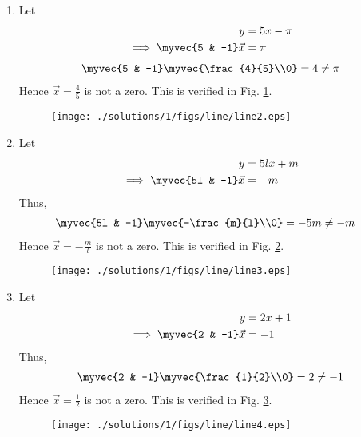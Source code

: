\begin{enumerate}[label=\arabic*.,ref=\thesubsubsection.\theenumi]
\item Let 
%
\begin{align}
y &= 5x -\pi
\\
\implies \myvec{5 & -1}\vec{x} &= \pi
\end{align}
%
%
\begin{align}
\myvec{5 & -1}\myvec{\frac{4}{5}\\0} = 4 \ne \pi
\end{align}
%
Hence $\vec{x}=\frac{4}{5}$ is not a zero. This is verified in Fig. \ref{fig:3.7.1_line2}.
%
\begin{figure}[!ht]
\texttt{[image: ./solutions/1/figs/line/line2.eps]}
\caption{}
\label{fig:3.7.1_line2}
\end{figure}
\item Let 
%
\begin{align}
y &= 5lx + m
\\
\implies \myvec{5l & -1}\vec{x} &= -m
\end{align}
%
Thus, 
%
\begin{align}
 \myvec{5l & -1}\myvec{-\frac{m}{l}\\0} &= -5m \ne -m
\end{align}
%
Hence $\vec{x}=-\frac{m}{l}$ is not a zero. This is verified in Fig. \ref{fig:3.7.1_line3}.
%
\begin{figure}[!ht]
\texttt{[image: ./solutions/1/figs/line/line3.eps]}
\caption{}
\label{fig:3.7.1_line3}
\end{figure}
\item Let 
%
\begin{align}
y &= 2x + 1
\\
\implies \myvec{2 & -1}\vec{x} &= -1
\end{align}
%
Thus, 
%
\begin{align}
\myvec{2 & -1}\myvec{\frac{1}{2}\\0} = 2 \ne -1
\end{align}
%
Hence $\vec{x}=\frac{1}{2}$ is not a zero. This is verified in Fig. \ref{fig:3.7.1_line4}.
%
\begin{figure}[!ht]
\texttt{[image: ./solutions/1/figs/line/line4.eps]}
\caption{}
\label{fig:3.7.1_line4}
\end{figure}
\renewcommand{\thefigure}{\theenumi}
\end{enumerate}
